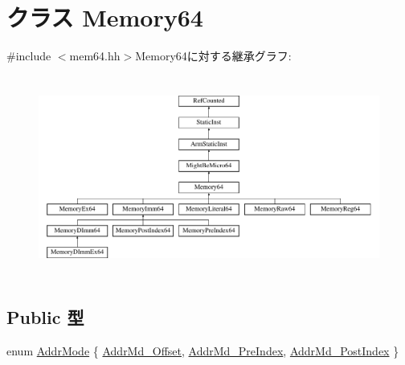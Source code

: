 \hypertarget{classArmISA_1_1Memory64}{
\section{クラス Memory64}
\label{classArmISA_1_1Memory64}
}


{\ttfamily \#include $<$mem64.hh$>$}Memory64に対する継承グラフ:\begin{figure}[H]
\begin{center}
\leavevmode
\includegraphics[height=6.68657cm]{classArmISA_1_1Memory64}
\end{center}
\end{figure}
\subsection*{Public 型}
\begin{DoxyCompactItemize}
\item 
enum \hyperlink{classArmISA_1_1Memory64_abf132b4ad93f3557cd3956577592ba68}{AddrMode} \{ \hyperlink{classArmISA_1_1Memory64_abf132b4ad93f3557cd3956577592ba68a65551ba1b10e5734f879f0333cdcb7da}{AddrMd\_\-Offset}, 
\hyperlink{classArmISA_1_1Memory64_abf132b4ad93f3557cd3956577592ba68ae21d09df49cf2636f746abd6749e9a47}{AddrMd\_\-PreIndex}, 
\hyperlink{classArmISA_1_1Memory64_abf132b4ad93f3557cd3956577592ba68af7adc379284699304b17af32b41e8ea1}{AddrMd\_\-PostIndex}
 \}
\end{DoxyCompactItemize}

